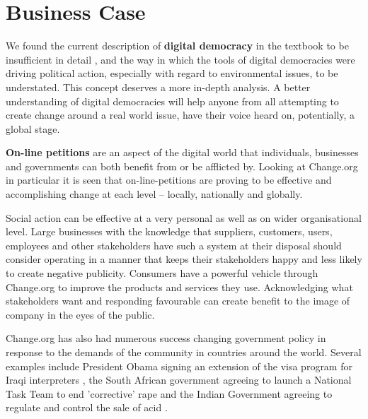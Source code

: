 \section{Business Case}
\label{subsec:businessCase}
We found the current description of \textbf{digital democracy} in the textbook to be insufficient in detail \citep[p. 815]{Plummer11}, and the way in which the tools of digital democracies were driving political action, especially with regard to environmental issues, to be understated. This concept deserves a more in-depth analysis. A better understanding of digital democracies will help anyone from all attempting to create change around a real world issue, have their voice heard on, potentially, a global stage. \par \vspace{0.2cm}
\textbf{On-line petitions} are an aspect of the digital world that individuals, businesses and governments can both benefit from or be afflicted by. Looking at Change.org in particular it is seen that on-line-petitions are proving to be effective and accomplishing change at each level -- locally, nationally and globally.\par \vspace{0.2cm}
Social action can be effective at a very personal as well as on wider organisational level. Large businesses with the knowledge that suppliers, customers, users, employees and other stakeholders have such a system at their disposal should consider operating in a manner that keeps their stakeholders happy and less likely to create negative publicity. Consumers have a powerful vehicle through Change.org to improve the products and services they use. Acknowledging what stakeholders want and responding favourable can create benefit to the image of company in the eyes of the public.\par \vspace{0.2cm}
Change.org has also had numerous success changing government policy in response to the demands of the community in countries around the world. Several examples include President Obama signing an extension of the visa program for Iraqi interpreters \citep{Change15}, the South African government agreeing to launch a National Task Team to end 'corrective' rape \citep{Change13} and the Indian Government agreeing to regulate and control the sale of acid \citep{Change12}.
